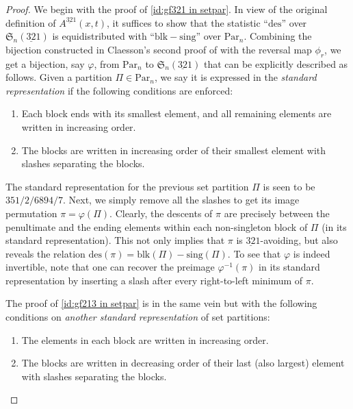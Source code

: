 \documentclass[11pt,reqno]{amsart}
\numberwithin{equation}{section}
\theoremstyle{plain}
\theoremstyle{definition}
\renewcommand{\S}{\mathfrak{S}}
\def\des{\mathrm{des}}
\def\blk{\mathrm{blk}}
\def\sing{\mathrm{sing}}
\def\Par{\mathrm{Par}}
\begin{document}
\begin{proof}
We begin with the proof of \eqref{id:gf321 in setpar}. In view of the original definition of $A^{\underline{32}1}(x,t)$, it suffices to show that the statistic ``$\des$'' over $\S_n(\underline{32}1)$ is equidistributed with ``$\blk -\sing$'' over $\Par_n$. Combining the bijection constructed in Claesson's second proof of \cite[Prop.\ 2]{cla01} with the reversal map $\phi_r$, we get a bijection, say $\varphi$, from $\Par_n$ to $\S_n(\underline{32}1)$ that can be explicitly described as follows. Given a partition $\Pi\in\Par_n$, we say it is expressed in the \textit{standard representation} if the following conditions are enforced:
\begin{enumerate}[label=(\roman*)]
    \item Each block ends with its smallest element, and all remaining elements are written in increasing order.
    \item The blocks are written in increasing order of their smallest element with slashes separating the blocks.
\end{enumerate}
The standard representation for the previous set partition $\Pi$ is seen to be $351/2/6894/7$. Next, we simply remove all the slashes to get its image permutation $\pi=\varphi(\Pi)$. Clearly, the descents of $\pi$ are precisely between the penultimate and the ending elements within each non-singleton block of $\Pi$ (in its standard representation). This not only implies that $\pi$ is $\underline{32}1$-avoiding, but also reveals the relation $\des(\pi)=\blk(\Pi)-\sing(\Pi)$. To see that $\varphi$ is indeed invertible, note that one can recover the preimage $\varphi^{-1}(\pi)$ in its standard representation by inserting a slash after every right-to-left minimum of $\pi$. 

The proof of \eqref{id:gf213 in setpar} is in the same vein but with the following conditions on \textit{another standard representation} of set partitions:
\begin{enumerate}[label=(\roman*)]
    \item The elements in each block are written in increasing order.
    \item The blocks are written in decreasing order of their last (also largest) element with slashes separating the blocks. \qedhere
\end{enumerate}
\end{proof}
\end{document}
